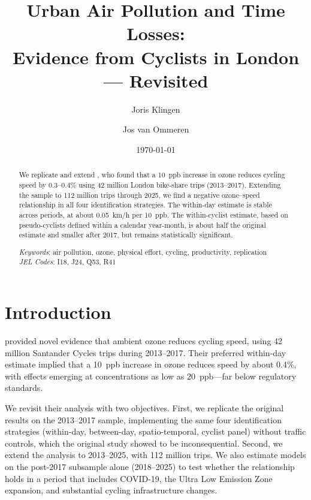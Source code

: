 \documentclass[12pt]{article}
\title{Urban Air Pollution and Time Losses: \\
Evidence from Cyclists in London --- Revisited}
\author{Joris Klingen \and Jos van Ommeren}
\date{\today}
\begin{document}
\maketitle

\begin{abstract}
We replicate and extend \citet{klingen2020urban}, who found that a 10~ppb increase in ozone reduces cycling speed by 0.3--0.4\% using 42 million London bike-share trips (2013--2017). Extending the sample to 112 million trips through 2025, we find a negative ozone--speed relationship in all four identification strategies. The within-day estimate is stable across periods, at about 0.05~km/h per 10~ppb. The within-cyclist estimate, based on pseudo-cyclists defined within a calendar year-month, is about half the original estimate and smaller after 2017, but remains statistically significant.

\medskip
\noindent \textit{Keywords}: air pollution, ozone, physical effort, cycling, productivity, replication \\
\noindent \textit{JEL Codes}: I18, J24, Q53, R41
\end{abstract}

\newpage

\section{Introduction} \label{sec:intro}

\citet{klingen2020urban} provided novel evidence that ambient ozone reduces cycling speed, using 42 million Santander Cycles trips during 2013--2017. Their preferred within-day estimate implied that a 10~ppb increase in ozone reduces speed by about 0.4\%, with effects emerging at concentrations as low as 20~ppb---far below regulatory standards.

We revisit their analysis with two objectives. First, we replicate the original results on the 2013--2017 sample, implementing the same four identification strategies (within-day, between-day, spatio-temporal, cyclist panel) without traffic controls, which the original study showed to be inconsequential. Second, we extend the analysis to 2013--2025, with 112 million trips. We also estimate models on the post-2017 subsample alone (2018--2025) to test whether the relationship holds in a period that includes COVID-19, the Ultra Low Emission Zone expansion, and substantial cycling infrastructure changes.
\end{document}
